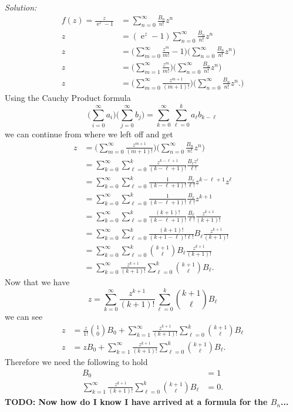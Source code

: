 \documentclass[10pt]{amsart}
\DeclareMathOperator{\E}{e}
\theoremstyle{nonumberplain}
\begin{document}
\begin{enumerate}[label={\bf {\arabic*}:}]
\begin{enumerate}
\noindent
\textit{Solution:} \\
\begin{align*}
f(z) = \frac {z}{\E^z - 1} &= \sum_{n=0}^{\infty} \frac{B_n}{n!} z^n \\
	z &= (\E^z - 1)\sum_{n=0}^{\infty} \frac{B_n}{n!} z^n \\
	z &= \bigg( \sum_{m=0}^\infty \frac {z^m}{m!} - 1\bigg) \bigg( \sum_{n=0}^{\infty} \frac{B_n}{n!} z^n \bigg) \\
	z &= \bigg( \sum_{m=1}^\infty \frac {z^m}{m!}\bigg) \bigg(\sum_{n=0}^{\infty} \frac{B_n}{n!} z^n \bigg) \\
	z &= \bigg( \sum_{m=0}^\infty \frac {z^{m+1}}{(m+1)!}\bigg) \bigg(\sum_{n=0}^{\infty} \frac{B_n}{n!} z^n. \bigg)
\end{align*}
Using the Cauchy Product formula
$$
\bigg( \sum_{i=0}^{\infty} a_i \bigg) \bigg(\sum_{j=0}^{\infty} b_j \bigg) = \sum_{k=0}^\infty \sum_{\ell=0}^k a_\ell b_{k - \ell}
$$
we can continue from where we left off and get
\begin{align*}
z &= \bigg( \sum_{m=0}^\infty \frac {z^{m+1}}{(m+1)!}\bigg) \bigg(\sum_{n=0}^{\infty} \frac{B_n}{n!} z^n\bigg) \\
	&= \sum_{k=0}^\infty \sum_{\ell=0}^k \frac {z^{k - \ell+1}}{(k - \ell+1)!} \frac{B_{\ell} z^\ell}{\ell!} \\
	&= \sum_{k=0}^\infty \sum_{\ell=0}^k \frac 1{(k - \ell+1)!} \frac{B_{\ell}}{\ell!} z^{k - \ell+1}z^\ell \\
	&= \sum_{k=0}^\infty \sum_{\ell=0}^k \frac 1{(k - \ell+1)!} \frac{B_{\ell}}{\ell!} z^{k+1} \\
	&= \sum_{k=0}^\infty \sum_{\ell=0}^k \frac {(k + 1)!}{(k - \ell+1)!} \frac{B_{\ell}}{\ell!} \frac{z^{k+1}}{(k + 1)!} \\
	&= \sum_{k=0}^\infty \sum_{\ell=0}^k \frac {(k + 1)!}{(k + 1 - \ell)!\ell!} B_{\ell} \frac{z^{k+1}}{(k + 1)!} \\
	&= \sum_{k=0}^\infty \sum_{\ell=0}^k {k + 1 \choose \ell} B_{\ell} \frac{z^{k+1}}{(k + 1)!} \\
	&= \sum_{k=0}^\infty \frac{z^{k+1}}{(k + 1)!} \sum_{\ell=0}^k {k + 1 \choose \ell} B_{\ell}.
\end{align*}
Now that we have
$$
z = \sum_{k=0}^\infty \frac{z^{k+1}}{(k + 1)!} \sum_{\ell=0}^k {k + 1 \choose \ell} B_{\ell}
$$
we can see
\begin{align*}
z &= \frac z {1!} {1 \choose 0}B_0 + \sum_{k=1}^\infty \frac{z^{k+1}}{(k + 1)!} \sum_{\ell=0}^k {k + 1 \choose \ell} B_{\ell} \\
z &= zB_0 + \sum_{k=1}^\infty \frac{z^{k+1}}{(k + 1)!} \sum_{\ell=0}^k {k + 1 \choose \ell} B_{\ell}.
\end{align*}
Therefore we need the following to hold
\begin{align*}
B_0 &= 1\\
\sum_{k=1}^\infty \frac{z^{k+1}}{(k + 1)!} \sum_{\ell=0}^k {k + 1 \choose \ell} B_{\ell} &= 0.
\end{align*}
\textbf{TODO: Now how do I know I have arrived at a formula for the $B_n$...}


\end{enumerate}
\end{enumerate}
\end{document}

